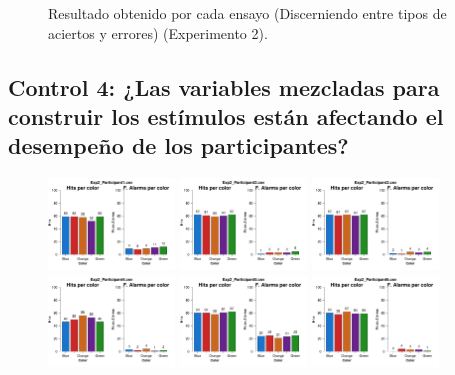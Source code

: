 \begin{figure}[th]
\caption[Outcome_Exp2]{Resultado obtenido por cada ensayo (Discerniendo entre tipos de aciertos y errores) (Experimento 2).}
\label{fig:Outcome_E2}
\end{figure}



\subsection{Control 4: ¿Las variables mezcladas para construir los estímulos están afectando el desempeño de los participantes?}



\begin{figure}[th]
\centering
\includegraphics[width=0.30\textwidth]{Figures/Color_Exp2_P1} \includegraphics[width=0.30\textwidth]{Figures/Color_Exp2_P2} \includegraphics[width=0.30\textwidth]{Figures/Color_Exp2_P3}
\includegraphics[width=0.30\textwidth]{Figures/Color_Exp2_P4} \includegraphics[width=0.30\textwidth]{Figures/Color_Exp2_P5} \includegraphics[width=0.30\textwidth]{Figures/Color_Exp2_P6}

\end{figure}
